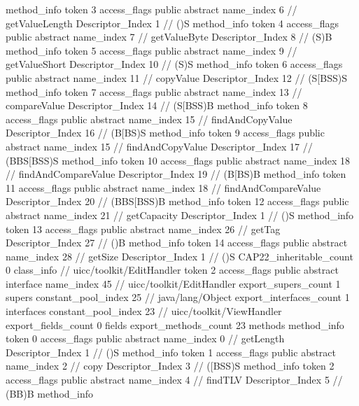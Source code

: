 {{{{				method_info {
					token	3
					access_flags	public abstract
					name_index	6		// getValueLength
					Descriptor_Index	1		// ()S
				}
				method_info {
					token	4
					access_flags	public abstract
					name_index	7		// getValueByte
					Descriptor_Index	8		// (S)B
				}
				method_info {
					token	5
					access_flags	public abstract
					name_index	9		// getValueShort
					Descriptor_Index	10		// (S)S
				}
				method_info {
					token	6
					access_flags	public abstract
					name_index	11		// copyValue
					Descriptor_Index	12		// (S[BSS)S
				}
				method_info {
					token	7
					access_flags	public abstract
					name_index	13		// compareValue
					Descriptor_Index	14		// (S[BSS)B
				}
				method_info {
					token	8
					access_flags	public abstract
					name_index	15		// findAndCopyValue
					Descriptor_Index	16		// (B[BS)S
				}
				method_info {
					token	9
					access_flags	public abstract
					name_index	15		// findAndCopyValue
					Descriptor_Index	17		// (BBS[BSS)S
				}
				method_info {
					token	10
					access_flags	public abstract
					name_index	18		// findAndCompareValue
					Descriptor_Index	19		// (B[BS)B
				}
				method_info {
					token	11
					access_flags	public abstract
					name_index	18		// findAndCompareValue
					Descriptor_Index	20		// (BBS[BSS)B
				}
				method_info {
					token	12
					access_flags	public abstract
					name_index	21		// getCapacity
					Descriptor_Index	1		// ()S
				}
				method_info {
					token	13
					access_flags	public abstract
					name_index	26		// getTag
					Descriptor_Index	27		// ()B
				}
				method_info {
					token	14
					access_flags	public abstract
					name_index	28		// getSize
					Descriptor_Index	1		// ()S
				}
			}
			CAP22_inheritable_count	0
		}
		class_info {		// uicc/toolkit/EditHandler
			token	2
			access_flags	public abstract interface
			name_index	45		// uicc/toolkit/EditHandler
			export_supers_count	1
			supers {
				constant_pool_index	25		// java/lang/Object
			}
			export_interfaces_count	1
			interfaces {
				constant_pool_index	23		// uicc/toolkit/ViewHandler
			}
			export_fields_count	0
			fields {
			}
			export_methods_count	23
			methods {
				method_info {
					token	0
					access_flags	public abstract
					name_index	0		// getLength
					Descriptor_Index	1		// ()S
				}
				method_info {
					token	1
					access_flags	public abstract
					name_index	2		// copy
					Descriptor_Index	3		// ([BSS)S
				}
				method_info {
					token	2
					access_flags	public abstract
					name_index	4		// findTLV
					Descriptor_Index	5		// (BB)B
				}
				method_info {
}}}}}
